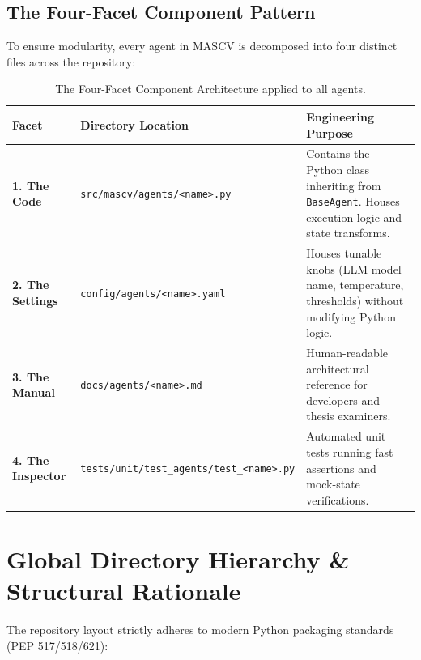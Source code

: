 \documentclass[11pt,a4paper]{article}
\begin{document}
\subsection{The Four-Facet Component Pattern}
To ensure modularity, every agent in MASCV is decomposed into four distinct files across the repository:
\begin{table}[H]
\centering
\small
\begin{tabular}{p{3.0cm} p{4.5cm} p{7.5cm}}
\toprule
\textbf{Facet} & \textbf{Directory Location} & \textbf{Engineering Purpose} \\
\midrule
\textbf{1. The Code} & \texttt{src/mascv/agents/<name>.py} & Contains the Python class inheriting from \texttt{BaseAgent}. Houses execution logic and state transforms. \\
\textbf{2. The Settings} & \texttt{config/agents/<name>.yaml} & Houses tunable knobs (LLM model name, temperature, thresholds) without modifying Python logic. \\
\textbf{3. The Manual} & \texttt{docs/agents/<name>.md} & Human-readable architectural reference for developers and thesis examiners. \\
\textbf{4. The Inspector} & \texttt{tests/unit/test\_agents/test\_<name>.py} & Automated unit tests running fast assertions and mock-state verifications. \\
\bottomrule
\end{tabular}
\caption{The Four-Facet Component Architecture applied to all agents.}
\end{table}

\section{Global Directory Hierarchy \& Structural Rationale}

The repository layout strictly adheres to modern Python packaging standards (PEP 517/518/621):
\end{document}
